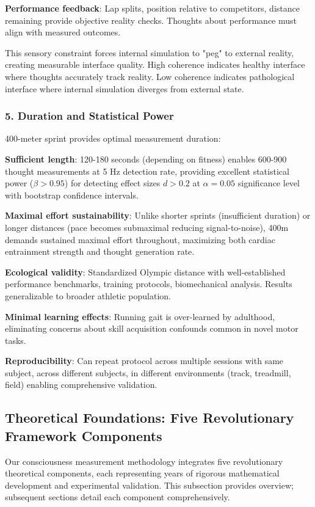 \documentclass[11pt,onecolumn]{article}
\begin{document}
\textbf{Performance feedback}: Lap splits, position relative to competitors, distance remaining provide objective reality checks. Thoughts about performance must align with measured outcomes.

This sensory constraint forces internal simulation to "peg" to external reality, creating measurable interface quality. High coherence indicates healthy interface where thoughts accurately track reality. Low coherence indicates pathological interface where internal simulation diverges from external state.

\subsubsection{5. Duration and Statistical Power}

400-meter sprint provides optimal measurement duration:

\textbf{Sufficient length}: 120-180 seconds (depending on fitness) enables 600-900 thought measurements at 5 Hz detection rate, providing excellent statistical power ($\beta > 0.95$) for detecting effect sizes $d > 0.2$ at $\alpha = 0.05$ significance level with bootstrap confidence intervals.

\textbf{Maximal effort sustainability}: Unlike shorter sprints (insufficient duration) or longer distances (pace becomes submaximal reducing signal-to-noise), 400m demands sustained maximal effort throughout, maximizing both cardiac entrainment strength and thought generation rate.

\textbf{Ecological validity}: Standardized Olympic distance with well-established performance benchmarks, training protocols, biomechanical analysis. Results generalizable to broader athletic population.

\textbf{Minimal learning effects}: Running gait is over-learned by adulthood, eliminating concerns about skill acquisition confounds common in novel motor tasks.

\textbf{Reproducibility}: Can repeat protocol across multiple sessions with same subject, across different subjects, in different environments (track, treadmill, field) enabling comprehensive validation.

\subsection{Theoretical Foundations: Five Revolutionary Framework Components}

Our consciousness measurement methodology integrates five revolutionary theoretical components, each representing years of rigorous mathematical development and experimental validation. This subsection provides overview; subsequent sections detail each component comprehensively.
\end{document}
